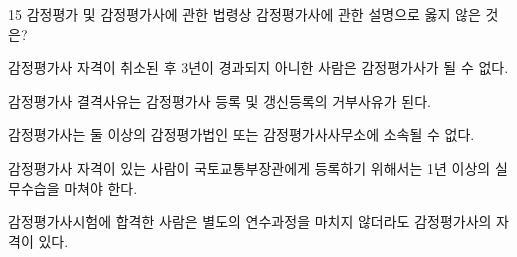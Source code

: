 \begin{question}{15}
감정평가 및 감정평가사에 관한 법령상 감정평가사에 관한 설명으로 옳지 않은 것은?
\begin{choices}
  \item 감정평가사 자격이 취소된 후 3년이 경과되지 아니한 사람은 감정평가사가 될 수 없다.
  \item 감정평가사 결격사유는 감정평가사 등록 및 갱신등록의 거부사유가 된다.
  \item 감정평가사는 둘 이상의 감정평가법인 또는 감정평가사사무소에 소속될 수 없다.
  \item 감정평가사 자격이 있는 사람이 국토교통부장관에게 등록하기 위해서는 1년 이상의 실무수습을 마쳐야 한다.
  \item 감정평가사시험에 합격한 사람은 별도의 연수과정을 마치지 않더라도 감정평가사의 자격이 있다.
\end{choices}
\end{question}
